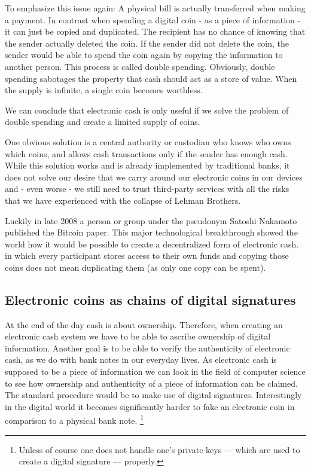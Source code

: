 \documentclass[a4paper,12pt,oneside,openany]{book}
\begin{document}
To emphasize this issue again: A physical bill is actually transferred
when making a payment. In contrast when spending a digital coin - as a
piece of information - it can just be copied and duplicated.  The
recipient has no chance of knowing that the sender actually deleted the
coin.  If the sender did not delete the coin, the sender would be able
to spend the coin again by copying the information to another person.
This process is called double spending.  Obviously, double spending
sabotages the property that cash should act as a store of value. When
the supply is infinite, a single coin becomes worthless.

We can conclude that electronic cash is only useful if we solve the
problem of double spending and create a limited supply of coins.

One obvious solution is a central authority or custodian who knows who
owns which coins, and allows cash transactions only if the sender has
enough cash.  While this solution works and is already implemented by
traditional banks, it does not solve our desire that we carry around our
electronic coins in our devices and - even worse - we still need to
trust third-party services with all the risks that we have experienced
with the collapse of Lehman Brothers.

Luckily in late 2008 a person or group under the pseudonym Satoshi
Nakamoto published the Bitcoin paper.  This major technological
breakthrough showed the world how it would be possible to create a
decentralized form of electronic cash.  in which every participant
stores access to their own funds and copying those coins does not mean
duplicating them (as only one copy can be spent).

\subsection{Electronic coins as chains of digital signatures}
    At the end of the day
cash is about ownership.  Therefore, when creating an electronic cash
system we have to be able to ascribe ownership of digital
information.  Another goal is to be able to verify the authenticity of
electronic cash, as we do with bank notes in our everyday lives.  As
electronic cash is supposed to be a piece of information we can look in
the field of computer science to see how ownership and authenticity of a
piece of information can be claimed.  The standard procedure would be to
make use of \gls{digital signature}s.  Interestingly in the digital
world it becomes significantly harder to fake an electronic coin in
comparison to a physical bank note.
\footnote{Unless of course one does not handle one's private keys ---
  which are used to create a digital signature --- properly.}
\end{document}
